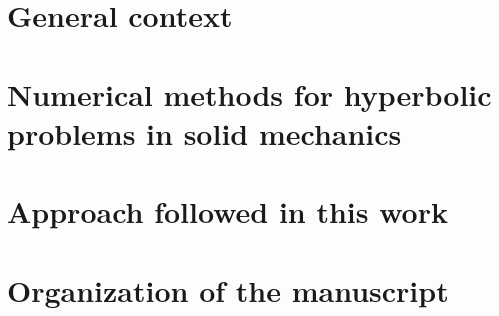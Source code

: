 \section{General context}


\section{Numerical methods for hyperbolic problems in solid mechanics}



\section{Approach followed in this work}


\section{Organization of the manuscript}


